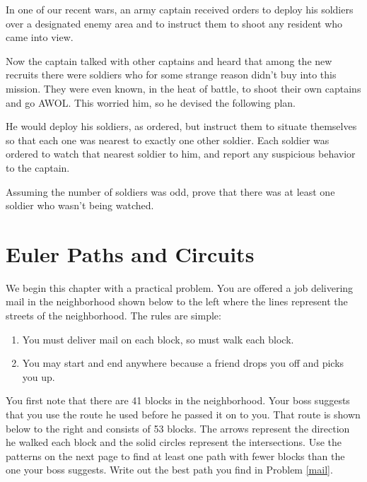 \begin{prb}
In one of our recent wars, an army captain received orders to deploy his soldiers over a designated enemy area and to instruct
them to shoot any resident who came into view.

Now the captain talked with other captains and heard that among the new recruits there were soldiers who for some strange reason
didn't buy into this mission. They were even known, in the heat of battle, to shoot their own captains and go AWOL.  This worried him, so he devised the following plan.

He would deploy his soldiers, as ordered, but instruct them to situate themselves so that each one was nearest to exactly one
other soldier.  Each soldier was ordered to watch that nearest soldier to him, and report any suspicious behavior to the captain.

Assuming the number of soldiers was odd, prove that there was at least one soldier who wasn't being watched.
\end{prb}




\chapter{Euler Paths and Circuits}
\label{chapeuler}

We  begin this chapter with a practical problem.  You are offered a job delivering mail in the neighborhood shown below to the left where the lines represent the streets of the neighborhood.  The rules are simple:
\begin{enumerate}
\item You must deliver mail on each block, so must walk each block.
\item You may start and end anywhere because a friend drops you off and picks you up.
\end{enumerate}
You first note that there are 41 blocks in the neighborhood.  Your boss suggests that you use the route he used before he passed it on to you. That route is shown below to the right and consists of 53 blocks.  The arrows represent the direction he walked each block and the solid circles represent the intersections. Use the patterns on the next page to find at least one path with fewer blocks than the one your boss suggests.  Write out the best path you find in Problem \ref{mail}.
\begin{annotation}
\end{annotation}
\bigskip

